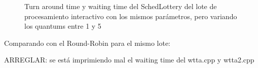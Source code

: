 \begin{figure}
\hfill
{}
\hfill
{}
\hfill
\caption{Turn around time y waiting time del SchedLottery del lote de procesamiento interactivo con los mismos parámetros,
	pero variando los quantums entre 1 y 5}
\end{figure}

Comparando con el Round-Robin para el mismo lote:

ARREGLAR: se está imprimiendo mal el waiting time del wtta.cpp y wtta2.cpp